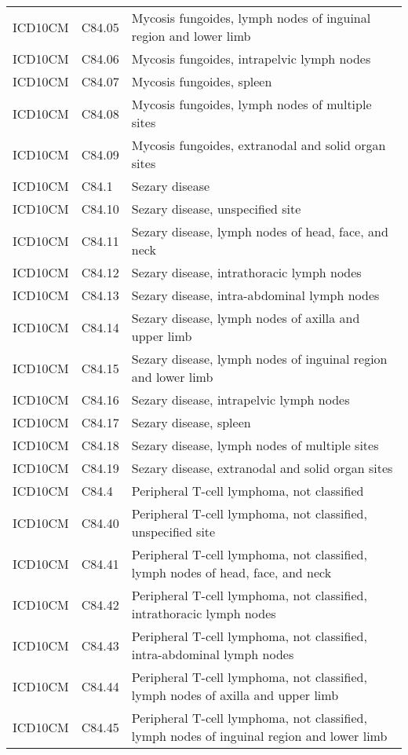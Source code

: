 \begin{longtable}{p{}p{}p{}}
  ICD10CM & C84.05 & Mycosis fungoides, lymph nodes of inguinal region and lower limb \\ 
  ICD10CM & C84.06 & Mycosis fungoides, intrapelvic lymph nodes \\ 
  ICD10CM & C84.07 & Mycosis fungoides, spleen \\ 
  ICD10CM & C84.08 & Mycosis fungoides, lymph nodes of multiple sites \\ 
  ICD10CM & C84.09 & Mycosis fungoides, extranodal and solid organ sites \\ 
  ICD10CM & C84.1 & Sezary disease \\ 
  ICD10CM & C84.10 & Sezary disease, unspecified site \\ 
  ICD10CM & C84.11 & Sezary disease, lymph nodes of head, face, and neck \\ 
  ICD10CM & C84.12 & Sezary disease, intrathoracic lymph nodes \\ 
  ICD10CM & C84.13 & Sezary disease, intra-abdominal lymph nodes \\ 
  ICD10CM & C84.14 & Sezary disease, lymph nodes of axilla and upper limb \\ 
  ICD10CM & C84.15 & Sezary disease, lymph nodes of inguinal region and lower limb \\ 
  ICD10CM & C84.16 & Sezary disease, intrapelvic lymph nodes \\ 
  ICD10CM & C84.17 & Sezary disease, spleen \\ 
  ICD10CM & C84.18 & Sezary disease, lymph nodes of multiple sites \\ 
  ICD10CM & C84.19 & Sezary disease, extranodal and solid organ sites \\ 
  ICD10CM & C84.4 & Peripheral T-cell lymphoma, not classified \\ 
  ICD10CM & C84.40 & Peripheral T-cell lymphoma, not classified, unspecified site \\ 
  ICD10CM & C84.41 & Peripheral T-cell lymphoma, not classified, lymph nodes of head, face, and neck \\ 
  ICD10CM & C84.42 & Peripheral T-cell lymphoma, not classified, intrathoracic lymph nodes \\ 
  ICD10CM & C84.43 & Peripheral T-cell lymphoma, not classified, intra-abdominal lymph nodes \\ 
  ICD10CM & C84.44 & Peripheral T-cell lymphoma, not classified, lymph nodes of axilla and upper limb \\ 
  ICD10CM & C84.45 & Peripheral T-cell lymphoma, not classified, lymph nodes of inguinal region and lower limb \\ 

\end{longtable}
